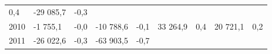 \begin{longtable}[]{@{}lllllllll@{}}
\begin{minipage}[t]{0.06\columnwidth}
0,4\strut
\end{minipage} & \begin{minipage}[t]{0.09\columnwidth}\raggedright
-29 085,7\strut
\end{minipage} & \begin{minipage}[t]{0.06\columnwidth}\raggedright
-0,3\strut
\end{minipage}\tabularnewline
\begin{minipage}[t]{0.05\columnwidth}\raggedright
2010\strut
\end{minipage} & \begin{minipage}[t]{0.10\columnwidth}\raggedright
-1 755,1\strut
\end{minipage} & \begin{minipage}[t]{0.06\columnwidth}\raggedright
-0,0\strut
\end{minipage} & \begin{minipage}[t]{0.16\columnwidth}\raggedright
-10 788,6\strut
\end{minipage} & \begin{minipage}[t]{0.06\columnwidth}\raggedright
-0,1\strut
\end{minipage} & \begin{minipage}[t]{0.12\columnwidth}\raggedright
33 264,9\strut
\end{minipage} & \begin{minipage}[t]{0.06\columnwidth}\raggedright
0,4\strut
\end{minipage} & \begin{minipage}[t]{0.09\columnwidth}\raggedright
20 721,1\strut
\end{minipage} & \begin{minipage}[t]{0.06\columnwidth}\raggedright
0,2\strut
\end{minipage}\tabularnewline
\begin{minipage}[t]{0.05\columnwidth}\raggedright
2011\strut
\end{minipage} & \begin{minipage}[t]{0.10\columnwidth}\raggedright
-26 022,6\strut
\end{minipage} & \begin{minipage}[t]{0.06\columnwidth}\raggedright
-0,3\strut
\end{minipage} & \begin{minipage}[t]{0.16\columnwidth}\raggedright
-63 903,5\strut
\end{minipage} & \begin{minipage}[t]{0.06\columnwidth}\raggedright
-0,7\strut
\end{minipage} & \begin{minipage}[t]{0.12\columnwidth}\raggedright

\end{minipage}
\end{longtable}
